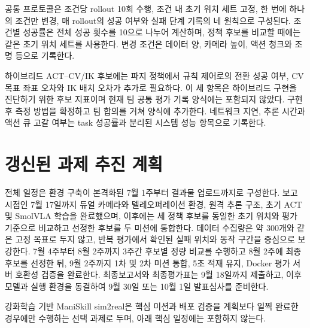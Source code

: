 \documentclass[titlepage]{pnureport}
\begin{document}
공통 프로토콜은 조건당 rollout 10회 수행, 조건 내 초기 위치 세트 고정, 한 번에 하나의 조건만 변경, 매 rollout의 성공 여부와 실패 단계 기록의 네 원칙으로 구성된다. 조건별 성공률은 전체 성공 횟수를 10으로 나누어 계산하며, 정책 후보를 비교할 때에는 같은 초기 위치 세트를 사용한다. 변경 조건은 데이터 양, 카메라 높이, 액션 청크와 조명 등으로 기록한다.

하이브리드 ACT--CV/IK 후보에는 파지 정책에서 규칙 제어로의 전환 성공 여부, CV 목표 좌표 오차와 IK 배치 오차가 추가로 필요하다. 이 세 항목은 하이브리드 구현을 진단하기 위한 후보 지표이며 현재 팀 공통 평가 기록 양식에는 포함되지 않았다. 구현 후 측정 방법을 확정하고 팀 합의를 거쳐 양식에 추가한다. 네트워크 지연, 추론 시간과 액션 큐 고갈 여부는 task 성공률과 분리된 시스템 성능 항목으로 기록한다.

\chapter{갱신된 과제 추진 계획}

전체 일정은 환경 구축이 본격화된 7월 1주부터 결과물 업로드까지로 구성한다. 보고 시점인 7월 17일까지 듀얼 카메라와 텔레오퍼레이션 환경, 원격 추론 구조, 초기 ACT 및 SmolVLA 학습을 완료했으며, 이후에는 세 정책 후보를 동일한 초기 위치와 평가 기준으로 비교하고 선정한 후보를 두 미션에 통합한다. 데이터 수집량은 약 300개와 같은 고정 목표로 두지 않고, 반복 평가에서 확인된 실패 위치와 동작 구간을 중심으로 보강한다. 7월 4주부터 8월 2주까지 3주간 후보별 정량 비교를 수행하고 8월 2주에 최종 후보를 선정한 뒤, 9월 2주까지 1차 및 2차 미션 통합, 5초 적재 유지, Docker 평가 서버 호환성 검증을 완료한다. 최종보고서와 최종평가표는 9월 18일까지 제출하고, 이후 모델과 실행 환경을 동결하여 9월 30일 또는 10월 1일 발표심사를 준비한다.

강화학습 기반 ManiSkill sim2real은 핵심 미션과 배포 검증을 계획보다 일찍 완료한 경우에만 수행하는 선택 과제로 두며, 아래 핵심 일정에는 포함하지 않는다.
\end{document}
